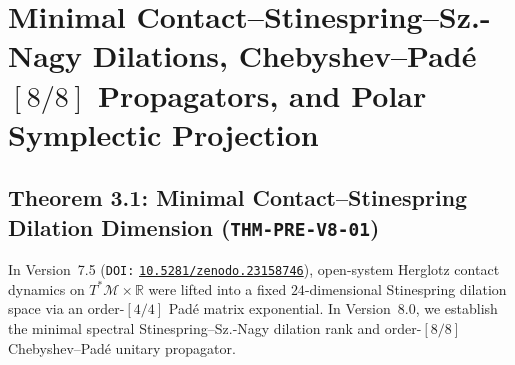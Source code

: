 \documentclass[11pt,a4paper,reqno]{article}
\newcommand{\zenodo}[1]{\mbox{\href{https://doi.org/10.5281/zenodo.#1}{\texttt{10.5281/zenodo.#1}}}}
\theoremstyle{plain}
\theoremstyle{definition}
\theoremstyle{remark}
\numberwithin{equation}{section}
\begin{document}
\bigskip

\section{Minimal Contact--Stinespring--Sz.-Nagy Dilations, Chebyshev--Pad\'e \texorpdfstring{$[8/8]$}{[8/8]} Propagators, and Polar Symplectic Projection}
\label{sec:contact_stinespring_symplectic}

\subsection{Theorem 3.1: Minimal Contact--Stinespring Dilation Dimension (\texttt{THM-PRE-V8-01})}
In Version~7.5 (\texttt{DOI:} \zenodo{23158746}), open-system Herglotz contact dynamics on $T^*\mathcal{M} \times \mathbb{R}$ were lifted into a fixed $24$-dimensional Stinespring dilation space via an order-$[4/4]$ Pad\'e matrix exponential. In Version~8.0, we establish the minimal spectral Stinespring--Sz.-Nagy dilation rank and order-$[8/8]$ Chebyshev--Pad\'e unitary propagator.
\end{document}
